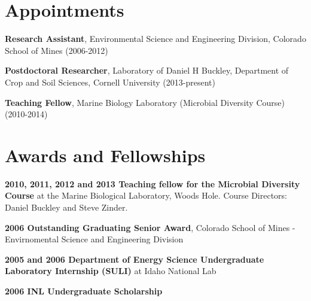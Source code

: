 \documentclass[letterpaper]{article}
\renewenvironment{itemize}{
  \begin{list}{}{
    \setlength{\leftmargin}{1.5em}
  }
}{
  \end{list}
}
\begin{document}

\section*{Appointments}
\begin{itemize}
    \item \textbf{Research Assistant}, Environmental Science and Engineering
        Division, Colorado School of Mines (2006-2012)
    \item \textbf{Postdoctoral Researcher}, Laboratory of Daniel H Buckley, Department of Crop and Soil
        Sciences, Cornell University (2013-present)
    \item \textbf{Teaching Fellow}, Marine Biology Laboratory (Microbial
        Diversity Course) (2010-2014)
\end{itemize}
\section*{Awards and Fellowships}
\begin{itemize}
    \item \textbf{2010, 2011, 2012 and 2013 Teaching fellow for the Microbial
        Diversity Course} at the Marine Biological Laboratory, Woods
        Hole.  Course Directors: Daniel Buckley and Steve Zinder.
    \item \textbf{2006 Outstanding Graduating Senior Award}, Colorado School of Mines - Envirnomental Science and Engineering Division
    \item \textbf{2005 and 2006 Department of Energy Science Undergraduate Laboratory Internship
        (SULI)} at Idaho National Lab
    \item \textbf{2006 INL Undergraduate Scholarship}
\end{itemize}
\end{document}
